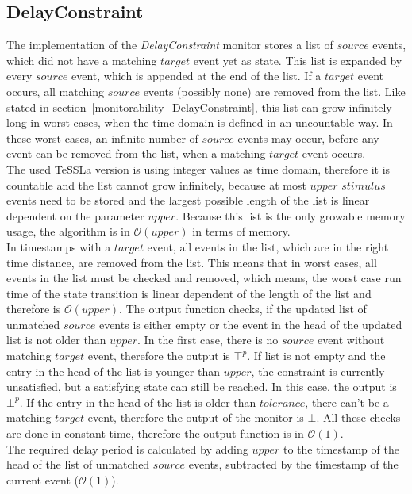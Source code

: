 \subsection{DelayConstraint}
	The implementation of the \emph{DelayConstraint} monitor stores a list of $source$ events, which did not have a matching $target$ event yet as state. This list is expanded by every $source$ event, which is appended at the end of the list. If a $target$ event occurs, all matching $source$ events (possibly none) are removed from the list. Like stated in section~\ref{monitorability_DelayConstraint}, this list can grow infinitely long in worst cases, when the time domain is defined in an uncountable way. In these worst cases, an infinite number of $source$ events may occur, before any event can be removed from the list, when a matching $target$ event occurs.\\
	The used TeSSLa version is using integer values as time domain, therefore it is countable and the list cannot grow infinitely, because at most $upper$ $stimulus$ events need to be stored and the largest possible length of the list is linear dependent on the parameter $upper$. Because this list is the only growable memory usage, the algorithm is in $\mathcal{O}(upper)$ in terms of memory.\\
	In timestamps with a $target$ event, all events in the list, which are in the right time distance, are removed from the list. This means that in worst cases, all events in the list must be checked and removed, which means, the worst case run time of the state transition is linear dependent of the length of the list and therefore is $\mathcal{O}(upper)$. %
	The output function checks, if the updated list of unmatched $source$ events is either empty or the event in the head of the updated list is not older than $upper$. In the first case, there is no $source$ event without matching $target$ event, therefore the output is $\top^p$. If list is not empty and the entry in the head of the list is younger than $upper$, the constraint is currently unsatisfied, but a satisfying state can still be reached. In this case, the output is $\bot^p$. If the entry in the head of the list is older than $tolerance$, there can't be a matching $target$ event, therefore the output of the monitor is $\bot$. All these checks are done in constant time, therefore the output function is in $\mathcal{O}(1)$.\\
	The required delay period is calculated by adding $upper$ to the timestamp of the head of the list of unmatched $source$ events, subtracted by the timestamp of the current event ($\mathcal{O}(1)$).
	
